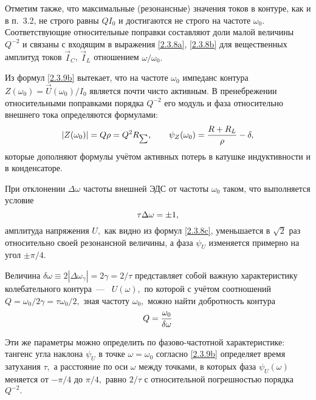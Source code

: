 Отметим также, что максимальные (резонансные) значения токов в контуре, как и в
п.~3.2, не строго равны $QI_0$ и достигаются не строго на частоте $\omega_0.$
Соответствующие относительные поправки составляют доли малой величины $Q^{-2}$ и
связаны с входящим в выражения \eqref{2.3.8a}, \eqref{2.3.8b} для вещественных
амплитуд токов $\vec I_C$, $\vec I_L$ отношением $\omega/\omega_0.$

Из формул \eqref{2.3.9b} вытекает, что на частоте $\omega_0$ импеданс контура
$Z(\omega_0)=\vec U(\omega_0)/I_0$ является почти чисто активным. В
пренебрежении относительными поправками порядка $Q^{-2}$ его модуль и фаза
относительно внешнего тока определяются формулами:
\begin{equation}\eqmark{2.3.10}
|Z(\omega_0)|=Q\rho=Q^2R_{\scriptscriptstyle \sum}, \qquad
\psi_Z(\omega_0)=\dfrac{R+R_L}{\rho}-\delta,
\end{equation}
которые дополняют формулы  учётом активных потерь в катушке
индуктивности и в конденсаторе.

При отклонении $\Delta\omega$ частоты внешней ЭДС от частоты $\omega_0$ таком,
что выполняется условие
\begin{equation}\eqmark{2.3.11}
\tau\Delta\omega=\pm1,
\end{equation}
амплитуда напряжения $U,$ как видно из формул \eqref{2.3.8c}, уменьшается в
$\sqrt{2}$ раз относительно своей резонансной величины, а фаза $\psi_U$
изменяется примерно на угол $\pm\pi/4.$

Величина $\delta\omega\equiv2|\Delta\omega_{\gamma}|=2\gamma=2/\tau$
представляет собой важную характеристику колебательного
контура~---~ $U(\omega),$ по которой с
учётом соотношений $Q=\omega_0/2\gamma=\tau\omega_0/2,$ зная частоту $\omega_0,$
можно найти добротность контура
\begin{equation}\eqmark{2.3.12}
Q=\dfrac{\omega_0}{\delta\omega}
\end{equation}

Эти же параметры можно определить по фазово-частотной характеристике: тангенс
угла наклона $\psi_U$ в точке $\omega=\omega_0$ согласно \eqref{2.3.9b}
определяет время затухания $\tau,$ а расстояние по оси $\omega$ между точками, в
которых фаза $\psi_U(\omega)$ меняется от $-\pi/4$ до $\pi/4,$ равно $2/\tau$ с
относительной погрешностью порядка $Q^{-2}.$

